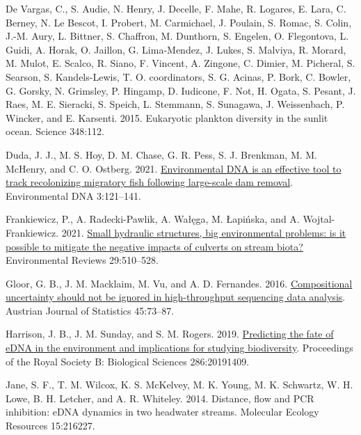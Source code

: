 \documentclass[
]{article}
\newlength{\cslhangindent}
\newlength{\cslentryspacingunit} %
\newenvironment{CSLReferences}[2] %
 {%
  \setlength{\parindent}{0pt}
  \ifodd #1
  \let\oldpar\par
  \def\par{\hangindent=\cslhangindent\oldpar}
  \fi
  \setlength{\parskip}{#2\cslentryspacingunit}
 }%
 {}
\begin{document}
\begin{CSLReferences}{1}{0}
\leavevmode{}%
De Vargas, C., S. Audie, N. Henry, J. Decelle, F. Mahe, R. Logares, E.
Lara, C. Berney, N. Le Bescot, I. Probert, M. Carmichael, J. Poulain, S.
Romac, S. Colin, J.-M. Aury, L. Bittner, S. Chaffron, M. Dunthorn, S.
Engelen, O. Flegontova, L. Guidi, A. Horak, O. Jaillon, G. Lima-Mendez,
J. Lukes, S. Malviya, R. Morard, M. Mulot, E. Scalco, R. Siano, F.
Vincent, A. Zingone, C. Dimier, M. Picheral, S. Searson, S.
Kandels-Lewis, T. O. coordinators, S. G. Acinas, P. Bork, C. Bowler, G.
Gorsky, N. Grimsley, P. Hingamp, D. Iudicone, F. Not, H. Ogata, S.
Pesant, J. Raes, M. E. Sieracki, S. Speich, L. Stemmann, S. Sunagawa, J.
Weissenbach, P. Wincker, and E. Karsenti. 2015. Eukaryotic plankton
diversity in the sunlit ocean. Science 348:112.

\leavevmode{}%
Duda, J. J., M. S. Hoy, D. M. Chase, G. R. Pess, S. J. Brenkman, M. M.
McHenry, and C. O. Ostberg. 2021.
\href{https://doi.org/10.1002/edn3.134}{Environmental DNA is an
effective tool to track recolonizing migratory fish following
large-scale dam removal}. Environmental DNA 3:121--141.

\leavevmode{}%
Frankiewicz, P., A. Radecki-Pawlik, A. Wałęga, M. Łapińska, and A.
Wojtal-Frankiewicz. 2021.
\href{https://doi.org/10.1139/er-2020-0126}{Small hydraulic structures,
big environmental problems: is it possible to mitigate the negative
impacts of culverts on stream biota?} Environmental Reviews 29:510--528.

\leavevmode{}%
Gloor, G. B., J. M. Macklaim, M. Vu, and A. D. Fernandes. 2016.
\href{https://doi.org/10.17713/ajs.v45i4.122}{Compositional uncertainty
should not be ignored in high-throughput sequencing data analysis}.
Austrian Journal of Statistics 45:73--87.

\leavevmode{}%
Harrison, J. B., J. M. Sunday, and S. M. Rogers. 2019.
\href{https://doi.org/10.1098/rspb.2019.1409}{Predicting the fate of
eDNA in the environment and implications for studying biodiversity}.
Proceedings of the Royal Society B: Biological Sciences 286:20191409.

\leavevmode{}%
Jane, S. F., T. M. Wilcox, K. S. McKelvey, M. K. Young, M. K. Schwartz,
W. H. Lowe, B. H. Letcher, and A. R. Whiteley. 2014. Distance, flow and
PCR inhibition: eDNA dynamics in two headwater streams. Molecular
Ecology Resources 15:216227.


\end{CSLReferences}
\end{document}

